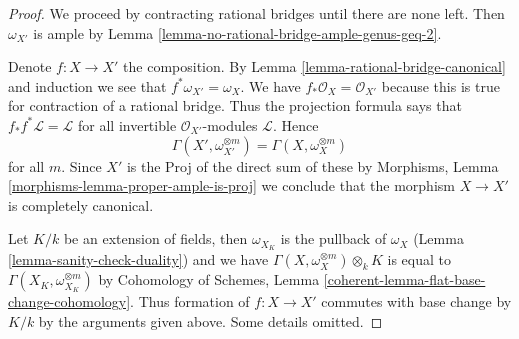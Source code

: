 \documentclass[10pt,a4paper]{amsart}
\theoremstyle{plain}
\theoremstyle{definition}
\theoremstyle{remark}
\numberwithin{equation}{subsection}
\begin{document}
\begin{proof}
We proceed by contracting rational bridges until there are none
left. Then $\omega_{X'}$ is ample by
Lemma \ref{lemma-no-rational-bridge-ample-genus-geq-2}.

\medskip\noindent
Denote $f : X \to X'$ the composition. By
Lemma \ref{lemma-rational-bridge-canonical} and induction we see that
$f^*\omega_{X'} = \omega_X$.
We have $f_*\mathcal{O}_X = \mathcal{O}_{X'}$
because this is true for contraction of a rational bridge.
Thus the projection formula says that
$f_*f^*\mathcal{L} = \mathcal{L}$ for all invertible
$\mathcal{O}_{X'}$-modules $\mathcal{L}$.
Hence
$$
\Gamma(X', \omega_{X'}^{\otimes m}) = \Gamma(X, \omega_X^{\otimes m})
$$
for all $m$. Since $X'$ is the Proj of the direct sum of these
by Morphisms, Lemma \ref{morphisms-lemma-proper-ample-is-proj}
we conclude that the morphism $X \to X'$ is completely canonical.

\medskip\noindent
Let $K/k$ be an extension of fields, then
$\omega_{X_K}$ is the pullback of $\omega_X$
(Lemma \ref{lemma-sanity-check-duality}) and we have
$\Gamma(X, \omega_X^{\otimes m}) \otimes_k K$
is equal to
$\Gamma(X_K, \omega_{X_K}^{\otimes m})$
by
Cohomology of Schemes, Lemma \ref{coherent-lemma-flat-base-change-cohomology}.
Thus formation of $f : X \to X'$ commutes with base change by
$K/k$ by the arguments given above. Some details omitted.
\end{proof}
\end{document}
